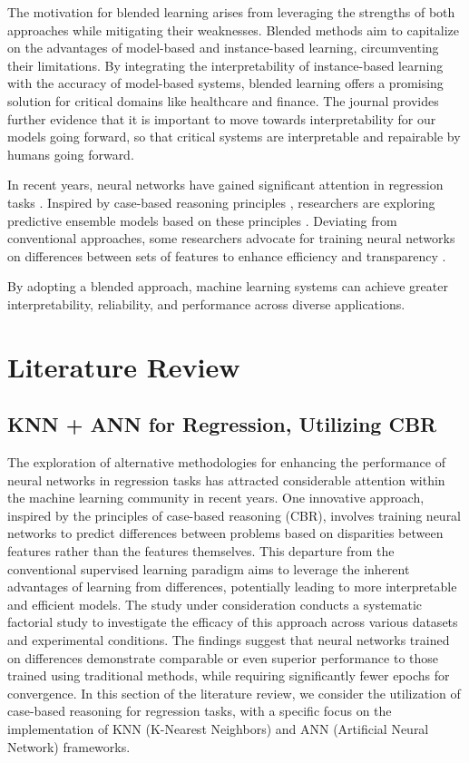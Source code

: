 \documentclass[a4paper, 12pt]{report}
\begin{document}
The motivation for blended learning arises from leveraging the strengths of both approaches while mitigating their weaknesses.
Blended methods aim to capitalize on the advantages of model-based and instance-based learning, circumventing their limitations.
By integrating the interpretability of instance-based learning with the accuracy of model-based systems, blended learning offers a promising solution for critical domains like healthcare and finance.
The journal \cite{rudin2019stop} provides further evidence that it is important to move towards interpretability for our models going forward, 
so that critical systems are interpretable and repairable by humans going forward.

In recent years, neural networks have gained significant attention in regression tasks \cite{neuralNetForRegression}.
Inspired by case-based reasoning principles \cite{riesbeck2013inside}, researchers are exploring predictive ensemble models based on these principles \cite{watsonCaseBasedReasoningReview}.
Deviating from conventional approaches, some researchers advocate for training neural networks on differences between sets of features to enhance efficiency and transparency \cite{learningFromDifferences2022}.

By adopting a blended approach, machine learning systems can achieve greater interpretability, reliability, and performance across diverse applications.

\chapter{Literature Review}
\label{ch:Literature Review}

\section{KNN + ANN for Regression, Utilizing CBR}

The exploration of alternative methodologies for enhancing the performance of neural networks in regression tasks has attracted considerable attention within the machine learning community in recent years.
One innovative approach, inspired by the principles of case-based reasoning (CBR),
involves training neural networks to predict differences between problems based on disparities between features rather than the features themselves.
This departure from the conventional supervised learning paradigm aims to leverage the inherent advantages of learning from differences, potentially leading to more interpretable and efficient models.
The study under consideration \cite{learningFromDifferences2022} conducts a systematic factorial study to investigate the efficacy of this approach across various datasets and experimental conditions.
The findings suggest that neural networks trained on differences demonstrate comparable or even superior performance to those trained using traditional methods,
while requiring significantly fewer epochs for convergence. In this section of the literature review, we consider the utilization of case-based reasoning for regression tasks,
with a specific focus on the implementation of KNN (K-Nearest Neighbors) and ANN (Artificial Neural Network) frameworks.
\end{document}
